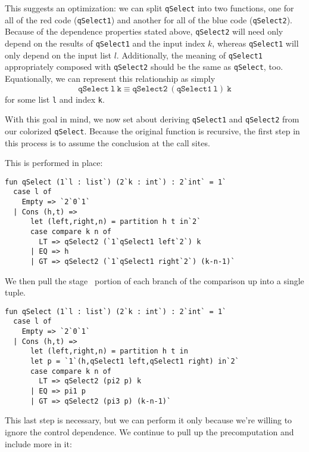 This suggests an optimization: we can split \texttt{qSelect} into two functions, 
one for all of the red code (\texttt{qSelect1}) and another for all of the blue code (\texttt{qSelect2}). 
Because of the dependence properties stated above, 
\texttt{qSelect2} will need only depend on the results of \texttt{qSelect1} and the input index $k$,
whereas \texttt{qSelect1} will only depend on the input list $l$.
Additionally, the meaning of \texttt{qSelect1} appropriately composed with \texttt{qSelect2} should be the same as \texttt{qSelect}, too.
Equationally, we can represent this relationship as simply 
\[
\mathtt{qSelect~l~k} \equiv \mathtt{qSelect2~(qSelect1~l)~k}
\]
for some list \texttt{l} and index \texttt{k}.



With this goal in mind, we now set about deriving \texttt{qSelect1} and \texttt{qSelect2} from our colorized \texttt{qSelect}.
Because the original function is recursive,
the first step in this process is to assume the conclusion at the call sites.


This is performed in place:
\begin{lstlisting} 
fun qSelect (1`l : list`) (2`k : int`) : 2`int` = 1`
  case l of
    Empty => `2`0`1`
  | Cons (h,t) => 
      let (left,right,n) = partition h t in`2`
      case compare k n of
        LT => qSelect2 (`1`qSelect1 left`2`) k
      | EQ => h
      | GT => qSelect2 (`1`qSelect1 right`2`) (k-n-1)`
\end{lstlisting}
We then pull the stage \bbone\ portion of each branch of the
comparison up into a single tuple.

\begin{lstlisting} 
fun qSelect (1`l : list`) (2`k : int`) : 2`int` = 1`
  case l of
    Empty => `2`0`1`
  | Cons (h,t) => 
      let (left,right,n) = partition h t in
      let p = `1`(h,qSelect1 left,qSelect1 right) in`2`
      case compare k n of
        LT => qSelect2 (pi2 p) k
      | EQ => pi1 p
      | GT => qSelect2 (pi3 p) (k-n-1)`
\end{lstlisting}

This last step is necessary, but we can perform it only because we're willing to ignore the control dependence.
We continue to pull up the precomputation and include more in it:

